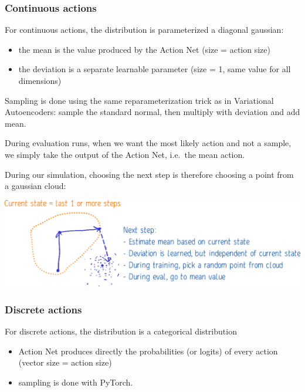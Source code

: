 \documentclass[
  letterpaper,
  DIV=11,
  numbers=noendperiod]{scrartcl}
\providecommand{\tightlist}{%
  \setlength{\itemsep}{0pt}\setlength{\parskip}{0pt}}\usepackage{longtable,booktabs,array}
\begin{document}
\hypertarget{continuous-actions}{%
\subsubsection{Continuous actions}\label{continuous-actions}}

For continuous actions, the distribution is parameterized a diagonal
gaussian:

\begin{itemize}
\tightlist
\item
  the mean is the value produced by the Action Net (size = action size)
\item
  the deviation is a separate learnable parameter (size = 1, same value
  for all dimensions)
\end{itemize}

Sampling is done using the same reparameterization trick as in
Variational Autoencoders: sample the standard normal, then multiply with
deviation and add mean.

During evaluation runs, when we want the most likely action and not a
sample, we simply take the output of the Action Net, i.e.~the mean
action.

During our simulation, choosing the next step is therefore choosing a
point from a gaussian cloud:

\hfill\break

\includegraphics{img/Explanation.png}

\hypertarget{discrete-actions}{%
\subsubsection{Discrete actions}\label{discrete-actions}}

For discrete actions, the distribution is a categorical distribution

\begin{itemize}
\tightlist
\item
  Action Net produces directly the probabilities (or logits) of every
  action (vector size = action size)
\item
  sampling is done with PyTorch.
\end{itemize}
\end{document}
